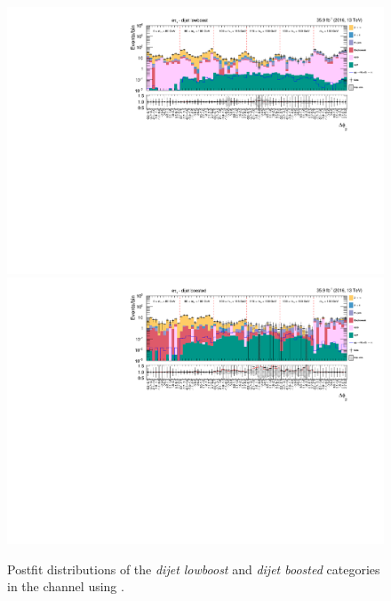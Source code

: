 \begin{figure}[h!]
    \centering       
        \includegraphics[width=\textwidth]{Figures/statana/Postfit_JEC_jdphi/postfit_fit_s_htt_et_3_13TeV.pdf}\\
        \includegraphics[width=\textwidth]{Figures/statana/Postfit_JEC_jdphi/postfit_fit_s_htt_et_4_13TeV.pdf}
    \caption{Postfit distributions of the \textit{dijet lowboost} and \textit{dijet boosted} categories in the \etau{} channel  using \jdphi{}.}
\end{figure}
\clearpage
